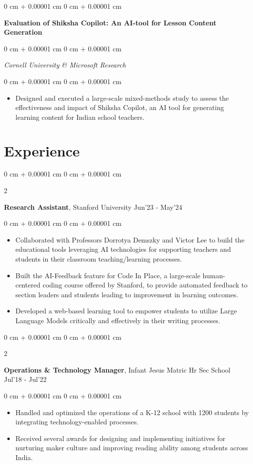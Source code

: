 \documentclass[10pt, letterpaper]{article}
\newenvironment{highlights}{
    \begin{itemize}[
        topsep=0.10 cm,
        parsep=0.10 cm,
        partopsep=0pt,
        itemsep=0pt,
        leftmargin=0 cm + 10pt
    ]
}{
    \end{itemize}
} %
\newenvironment{onecolentry}{
    \begin{adjustwidth}{
        0 cm + 0.00001 cm
    }{
        0 cm + 0.00001 cm
    }
}{
    \end{adjustwidth}
} %
\newenvironment{twocolentry}[2][]{
    \onecolentry
    \def\secondColumn{#2}
    \setcolumnwidth{\fill, 4.5 cm}
    \begin{paracol}{2}
}{
    \switchcolumn \raggedleft \secondColumn
    \end{paracol}
    \endonecolentry
} %
\newcommand{\datetext}[1]{\color{gray800}#1}
\newcommand{\experienceentry}[3]{
    \begin{twocolentry}{
        \datetext{#3}
    }
        \textbf{#1}, #2\end{twocolentry}

    \vspace{0.10 cm}
}
\newcommand{\researchprojectentry}[2]{
    \begin{onecolentry}
        \textbf{#1}
    \end{onecolentry}
    \vspace{0.06cm}
    \begin{onecolentry}
        \textit{#2}
    \end{onecolentry}
    \vspace{0.10cm}
}
\newcommand{\itemspacing}[1]{\vspace{0.275 cm}#1}
\begin{document}
        \itemspacing
        
        \researchprojectentry{Evaluation of Shiksha Copilot: An AI-tool for Lesson Content Generation}{Cornell University \& Microsoft Research}
            \begin{onecolentry}
                \begin{highlights}
                    \item Designed and executed a large-scale mixed-methods study to assess the effectiveness and impact of Shiksha Copilot, an AI tool for generating learning content for Indian school teachers.
                \end{highlights}
            \end{onecolentry}

    \section{Experience}
        \experienceentry{Research Assistant}{Stanford University}{Jun'23 - May'24}
        \begin{onecolentry}
            \begin{highlights}
                \item Collaborated with Professors Dorrotya Demszky and Victor Lee to build the educational tools leveraging AI technologies for supporting teachers and students in their classroom teaching/learning processes.
                \item Built the AI-Feedback feature for Code In Place, a large-scale human-centered coding course offered by Stanford, to provide automated feedback to section leaders and students leading to improvement in learning outcomes.
                \item Developed a web-based learning tool to empower students to utilize Large Language Models critically and effectively in their writing processes.
            \end{highlights}
        \end{onecolentry}

        \itemspacing

        \experienceentry{Operations \& Technology Manager}{Infant Jesus Matric Hr Sec School}{Jul'18 - Jul'22}
        \begin{onecolentry}
            \begin{highlights}
                \item Handled and optimized the operations of a K-12 school with 1200 students by integrating technology-enabled processes.
                \item Received several awards for designing and implementing initiatives for nurturing maker culture and improving reading ability among students across India. 
            \end{highlights}
        \end{onecolentry}
        
\end{document}
